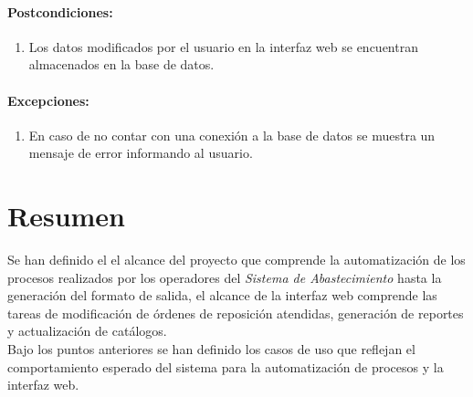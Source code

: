 \paragraph{Postcondiciones:}
\begin{enumerate}
  \item Los datos modificados por el usuario en la interfaz web se encuentran almacenados en la base de datos.
\end{enumerate}
\paragraph{Excepciones:}
\begin{enumerate}
  \item En caso de no contar con una conexión a la base de datos se muestra un mensaje de error informando al usuario.
\end{enumerate}

\section{Resumen}
Se han definido el el alcance del proyecto que comprende la automatización de los procesos realizados por los operadores del \textit{Sistema de Abastecimiento} hasta la generación del formato de salida, el alcance de la interfaz web comprende las tareas de modificación de órdenes de reposición atendidas, generación de reportes y actualización de catálogos.\\
Bajo los puntos anteriores se han definido los casos de uso que reflejan el comportamiento esperado del sistema para la automatización de procesos y la interfaz web.
